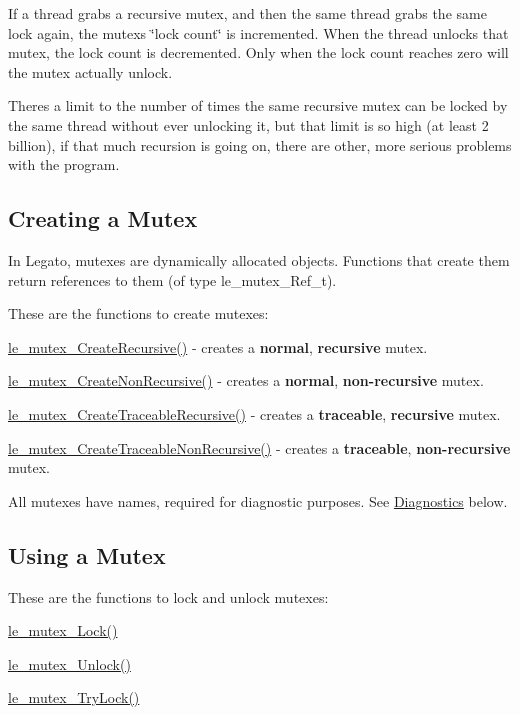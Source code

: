 If a thread grabs a recursive mutex, and then the same thread grabs the same lock again, the mutex\textquotesingle{}s \char`\"{}lock count\char`\"{} is incremented. When the thread unlocks that mutex, the lock count is decremented. Only when the lock count reaches zero will the mutex actually unlock.

There\textquotesingle{}s a limit to the number of times the same recursive mutex can be locked by the same thread without ever unlocking it, but that limit is so high (at least 2 billion), if that much recursion is going on, there are other, more serious problems with the program.\hypertarget{c_mutex_c_mutex_create}{}\subsection{Creating a Mutex}\label{c_mutex_c_mutex_create}
In Legato, mutexes are dynamically allocated objects. Functions that create them return references to them (of type le\+\_\+mutex\+\_\+\+Ref\+\_\+t).

These are the functions to create mutexes\+:
\begin{DoxyItemize}
\item {\ttfamily \hyperlink{le__mutex_8h_ac7dd2b69f4b905d56df969c9085a570b}{le\+\_\+mutex\+\_\+\+Create\+Recursive()}} -\/ creates a {\bfseries normal}, {\bfseries recursive} mutex.
\item {\ttfamily \hyperlink{le__mutex_8h_a602e2c18e646db7af0d68bb5fb103207}{le\+\_\+mutex\+\_\+\+Create\+Non\+Recursive()}} -\/ creates a {\bfseries normal}, {\bfseries non-\/recursive} mutex.
\item {\ttfamily \hyperlink{le__mutex_8h_a17bcd94aaf2c29e10cd90f949b1e13a7}{le\+\_\+mutex\+\_\+\+Create\+Traceable\+Recursive()}} -\/ creates a {\bfseries traceable}, {\bfseries recursive} mutex.
\item {\ttfamily \hyperlink{le__mutex_8h_abe16eb57e75131afe47d06c0530d5ee9}{le\+\_\+mutex\+\_\+\+Create\+Traceable\+Non\+Recursive()}} -\/ creates a {\bfseries traceable}, {\bfseries non-\/recursive} mutex.
\end{DoxyItemize}

All mutexes have names, required for diagnostic purposes. See \hyperlink{c_mutex_c_mutex_diagnostics}{Diagnostics} below.\hypertarget{c_mutex_c_mutex_locking}{}\subsection{Using a Mutex}\label{c_mutex_c_mutex_locking}
These are the functions to lock and unlock mutexes\+:
\begin{DoxyItemize}
\item {\ttfamily \hyperlink{le__mutex_8h_ad5b7d94710f420cd945229648e7a80e7}{le\+\_\+mutex\+\_\+\+Lock()}} 
\item {\ttfamily \hyperlink{le__mutex_8h_aae68b71222e20c55ff3bf2d7b52e3009}{le\+\_\+mutex\+\_\+\+Unlock()}} 
\item {\ttfamily \hyperlink{le__mutex_8h_a43864999f70f0a825cf8ca87f9a2ee2c}{le\+\_\+mutex\+\_\+\+Try\+Lock()}} 
\end{DoxyItemize}

